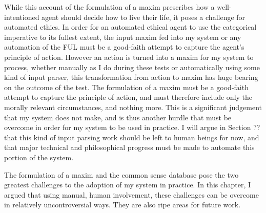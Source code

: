 \begin{isabellebody}
\begin{isamarkuptext}
While this account of the formulation of a maxim prescribes how a well-intentioned agent should
decide how to live their life, it poses a challenge for automated ethics. In order for an automated
ethical agent to use the categorical imperative to its fullest extent, the input maxim fed into
my system or any automation of the FUL must be a good-faith attempt to capture the agent's principle
of action. However an action is turned into a maxim for my system to process, whether manually as I do
during these tests or automatically using some kind of input parser, this transformation from action
to maxim has huge bearing on the outcome of the test. The formulation of a maxim must be a good-faith 
attempt to capture the principle of action, and must therefore include only the morally relevant
circumstances, and nothing more. This is a significant judgement that my system does not make, and is 
thus another hurdle that must be overcome in order for my system to be used in practice. I will argue
in Section ?? that this kind of input parsing work should be left to human beings for now, and that
major technical and philosophical progress must be made to automate this portion of the system. 

The formulation of a maxim and the common sense database pose the two greatest challenges to the adoption
of my system in practice. In this chapter, I argued that using manual, human involvement, these challenges
can be overcome in relatively uncontroversial ways. They are also ripe areas for future work.%
\end{isamarkuptext}\isamarkuptrue%
%
\isadelimtheory
%
\endisadelimtheory
%
\isatagtheory
%
\endisatagtheory
{\isafoldtheory}%
%
\isadelimtheory
%
\endisadelimtheory
%
\end{isabellebody}%
\endinput

